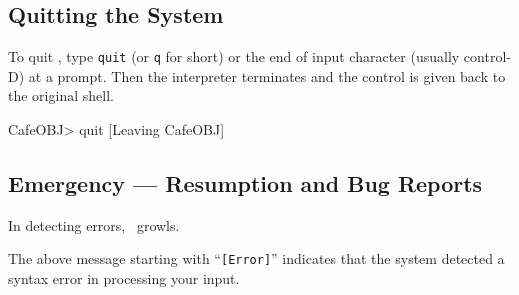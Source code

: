 \documentclass[a4paper]{memoir}
\begin{document}


\subsection{Quitting the System}

To quit \cafeobj, type \verb|quit| (or \verb|q| for short) or the end of
input character (usually control-D) at a prompt.
Then the interpreter terminates and the control is given back to
the original shell.
\begin{vvtm}
\begin{ccode}
  CafeOBJ> quit
  [Leaving CafeOBJ]
\end{ccode}
\end{vvtm}

\subsection{Emergency --- Resumption and Bug Reports}

In detecting errors, \cafeobj~growls.
\begin{vvtm}
\begin{ccode}
  CafeOBJ> module ERROR }
  [Error]: was expecting the symbol `{' not `}' .

  CafeOBJ> 
\end{ccode}
\end{vvtm}
The above message starting with ``\verb|[Error]|'' indicates that
the system detected a syntax error in processing your input.
\end{document}
